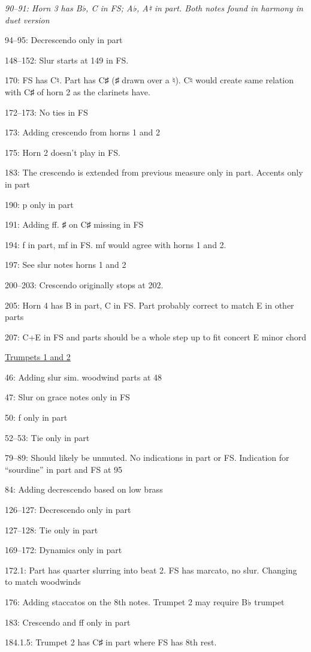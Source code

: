 \documentclass[twoside]{article}
\begin{document}
\begin{hangparas}{15pt}{1}
\begin{multicols}{2}
\textit{90--91: Horn 3 has B♭, C in FS; A♭, A♮ in part. Both notes found in harmony in duet version}

94--95: Decrescendo only in part

148--152: Slur starts at 149 in FS.

170: FS has C♮. Part has C♯ (♯ drawn over a ♮). C♮ would create same relation with C♯ of horn 2 as the clarinets have.

172--173: No ties in FS

173: Adding crescendo from horns 1 and 2

175: Horn 2 doesn't play in FS.

183: The crescendo is extended from previous measure only in part. Accents only in part

190: p only in part

191: Adding ff. ♯ on C♯ missing in FS

194: f in part, mf in FS. mf would agree with horns 1 and 2.

197: See slur notes horns 1 and 2

200--203: Crescendo originally stops at 202.

205: Horn 4 has B in part, C in FS. Part probably correct to match E in other parts

207: C+E in FS and parts should be a whole step up to fit concert E minor chord

\underline{Trumpets 1 and 2}

46: Adding slur sim. woodwind parts at 48

47: Slur on grace notes only in FS

50: f only in part

52--53: Tie only in part

79--89: Should likely be unmuted. No indications in part or FS. Indication for ``sourdine'' in part and FS at 95

84: Adding decrescendo based on low brass

126--127: Decrescendo only in part

127--128: Tie only in part

169--172: Dynamics only in part

172.1: Part has quarter slurring into beat 2. FS has marcato, no slur. Changing to match woodwinds

176: Adding staccatos on the 8th notes. Trumpet 2 may require B♭ trumpet

183: Crescendo and ff only in part

184.1.5: Trumpet 2 has C♯ in part where FS has 8th rest.


\end{multicols}
\end{hangparas}
\end{document}
